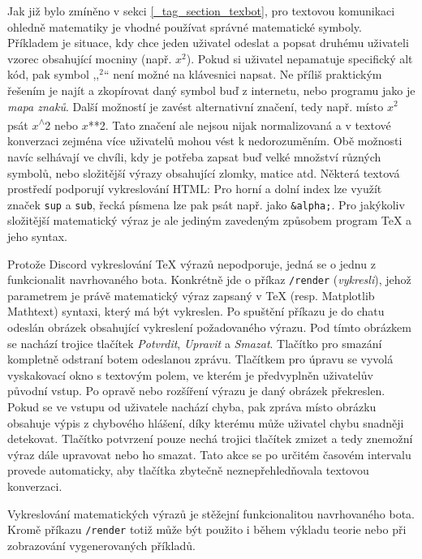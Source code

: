 \documentclass[FM]{tulthesis}
\begin{document}
	Jak již bylo zmíněno v sekci \ref{_tag_section_texbot}, pro textovou komunikaci ohledně matematiky je vhodné používat správné matematické symboly. Příkladem je situace, kdy chce jeden uživatel odeslat a popsat druhému uživateli vzorec obsahující mocniny (např. $x^2$). Pokud si uživatel nepamatuje specifický alt kód, pak symbol ,,$^2$`` není možné na klávesnici napsat. Ne příliš praktickým řešením je najít a zkopírovat daný symbol buď z internetu, nebo programu jako je \textit{mapa znaků}. Další možností je zavést alternativní značení, tedy např. místo $x^2$ psát $x$\textsuperscript{$\wedge$}2 nebo $x$**2. Tato značení ale nejsou nijak normalizovaná a v textové konverzaci zejména více uživatelů mohou vést k nedorozuměním. Obě možnosti navíc selhávají ve chvíli, kdy je potřeba zapsat buď velké množství různých symbolů, nebo složitější výrazy obsahující zlomky, matice atd. Některá textová prostředí podporují vykreslování HTML: Pro horní a dolní index lze využít značek \verb*|sup| a \verb*|sub|, řecká písmena lze pak psát např. jako \verb*|&alpha;|. Pro jakýkoliv složitější matematický výraz je ale jediným zavedeným způsobem program TeX a jeho syntax.
	
	Protože Discord vykreslování TeX výrazů nepodporuje, jedná se o jednu z funkcionalit navrhovaného bota. Konkrétně jde o příkaz \verb*|/render| (\textit{vykresli}), jehož parametrem je právě matematický výraz zapsaný v TeX (resp. Matplotlib Mathtext) syntaxi, který má být vykreslen. Po spuštění příkazu je do chatu odeslán obrázek obsahující vykreslení požadovaného výrazu. Pod tímto obrázkem se nachází trojice tlačítek \textit{Potvrdit}, \textit{Upravit} a \textit{Smazat}. Tlačítko pro smazání kompletně odstraní botem odeslanou zprávu. Tlačítkem pro úpravu se vyvolá vyskakovací okno s textovým polem, ve kterém je předvyplněn uživatelův původní vstup. Po opravě nebo rozšíření výrazu je daný obrázek překreslen. Pokud se ve vstupu od uživatele nachází chyba, pak zpráva místo obrázku obsahuje výpis z chybového hlášení, díky kterému může uživatel chybu snadněji detekovat. Tlačítko potvrzení pouze nechá trojici tlačítek zmizet a tedy znemožní výraz dále upravovat nebo ho smazat. Tato akce se po určitém časovém intervalu provede automaticky, aby tlačítka zbytečně neznepřehledňovala textovou konverzaci.
	
	Vykreslování matematických výrazů je stěžejní funkcionalitou navrhovaného bota. Kromě příkazu \verb*|/render| totiž může být použito i během výkladu teorie nebo při zobrazování vygenerovaných příkladů.
	
\end{document}
